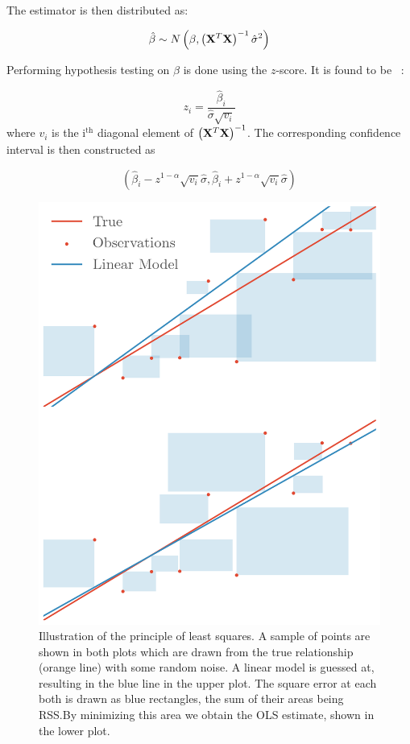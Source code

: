 The estimator is then distributed as:

\begin{equation*}
\hat\beta \sim N\left( \beta, \left( \vb{X}^{T}\vb{X} \right)^{-1}\hat\sigma^{2} \right)
\end{equation*}

Performing hypothesis testing on \(\hat\beta\) is done using the \(z\)-score. It
is found to be~\cite{statelem} :

\begin{equation*}
  z_{i} = \frac{\hat\beta_{i}}{\hat\sigma\sqrt{v_{i}}}
\end{equation*}
where \(v_{i}\) is the \(\text{i}^{\text{th}}\) diagonal element of \(\left( \vb{X}^{T}\vb{X} \right)^{-1}\).
The corresponding confidence interval is then constructed as

\begin{equation*}
  \left( \hat\beta_{i} - z^{1-\alpha}\sqrt{v_{i}}\hat\sigma,  \hat\beta_{i} + z^{1-\alpha}\sqrt{v_{i}}\hat\sigma\right)
\end{equation*}

\begin{figure}[]
  \centering
  \showthe\columnwidth
  \includegraphics[]{figures/leastsquares.png}
  \caption{\label{fig:lq} Illustration of the principle of least squares. A
    sample of points are shown in both plots which are drawn from the true
    relationship (orange line) with some random noise. A linear model is
    guessed at, resulting in the blue line in the upper plot. The square error at
    each both is drawn as blue rectangles, the sum of their areas being RSS.\@ By
    minimizing this area we obtain the OLS estimate, shown in the lower plot.}
\end{figure}

